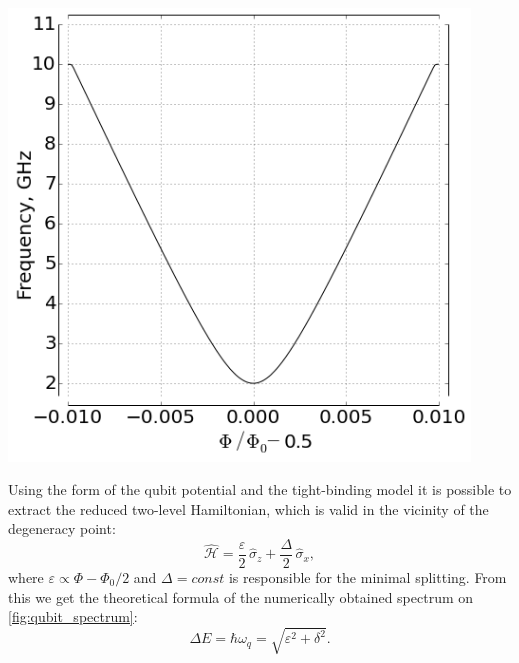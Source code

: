 \documentclass[a0, portrait]{a0poster}
\begin{document}
\begin{multicols}{2}
\begin{tcolorbox}[left=1cm, right=1cm, top=0.5cm, bottom=0.5cm, 
                  title={\Large Flux qubit}, bottomtitle=.3cm, toptitle=.5cm
                  ]
\begin{minipage}{0.5\textwidth}
\centering
\includegraphics[height=12cm]{Pictures/spectrum_hyp}
\label{fig:qubit_spectrum}
\end{minipage}
\begin{minipage}{0.5\textwidth}
Using the form of the qubit potential and the tight-binding model it is possible to extract the reduced two-level Hamiltonian, which is valid in the vicinity of the degeneracy point:
\begin{equation}
\mathcal{\hat H} = \frac{\varepsilon}{2}\,\hat \sigma_z + \frac{\Delta}{2}\,\hat \sigma_x,
\label{eq:red_ham}
\end{equation}
where $\varepsilon \propto \Phi-\Phi_0/2$ and $\Delta = const$ is responsible for the minimal splitting. From this we get the theoretical formula of the numerically obtained spectrum on \autoref{fig:qubit_spectrum}:
\begin{equation}
\Delta E = \hbar \omega_q = \sqrt{\varepsilon^2+\delta^2}.
\end{equation}
\end{minipage}\\
\end{tcolorbox}


\end{multicols}
\end{document}
